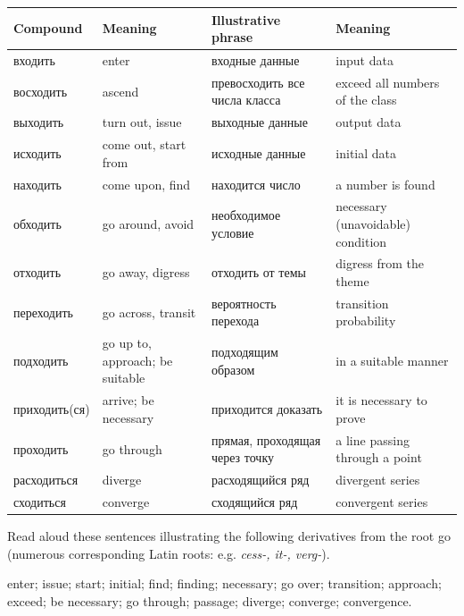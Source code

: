 \begingroup
\small
\setlength{\tabcolsep}{3pt}
\renewcommand{\arraystretch}{1.08}
\begin{longtable}{@{}>{\cyrillicfont}p{29mm}p{30mm}>{\cyrillicfont}p{46mm}p{38mm}@{}}
\toprule
\normalfont Compound & Meaning & \normalfont Illustrative phrase & Meaning\\
\midrule
\endhead
входить & enter & входные данные & input data\\
восходить & ascend & превосходить все числа класса & exceed all numbers of the class\\
выходить & turn out, issue & выходные данные & output data\\
исходить & come out, start from & исходные данные & initial data\\
находить & come upon, find & находится число & a number is found\\
обходить & go around, avoid & необходимое условие & necessary (unavoidable) condition\\
отходить & go away, digress & отходить от темы & digress from the theme\\
переходить & go across, transit & вероятность перехода & transition probability\\
подходить & go up to, approach; be suitable & подходящим образом & in a suitable manner\\
приходить(ся) & arrive; be necessary & приходится доказать & it is necessary to prove\\
проходить & go through & прямая, проходящая через точку & a line passing through a point\\
расходиться & diverge & расходящийся ряд & divergent series\\
сходиться & converge & сходящийся ряд & convergent series\\
\bottomrule
\end{longtable}
\endgroup

\begin{keybox}[Exercise 5.3]
Read aloud these sentences illustrating the following derivatives from the root  go (numerous corresponding Latin roots: e.g. \emph{cess-, it-, verg-}).
\end{keybox}

\noindent{} enter;  issue;  start;  initial;  find;  finding;  necessary;  go over;  transition;  approach;  exceed;  be necessary;  go through;  passage;  diverge;  converge;  convergence.

